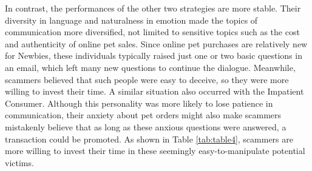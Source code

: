 \documentclass[ oneside,%
                    author={Cassie Qing Tang},
                    degree={BSc},
                     title={An Automated Response System for Disrupting Online Pet Scamming \\ },
                    subtitle={ }]{dissertation}
\begin{document}
In contrast, the performances of the other two strategies are more stable. Their diversity in language and naturalness in emotion made the topics of communication more diversified, not limited to sensitive topics such as the cost and authenticity of online pet sales. Since online pet purchases are relatively new for Newbies, these individuals typically raised just one or two basic questions in an email, which left many new questions to continue the dialogue. Meanwhile, scammers believed that such people were easy to deceive, so they were more willing to invest their time. A similar situation also occurred with the Impatient Consumer. Although this personality was more likely to lose patience in communication, their anxiety about pet orders might also make scammers mistakenly believe that as long as these anxious questions were answered, a transaction could be promoted. As shown in Table \ref{tab:table4}, scammers are more willing to invest their time in these seemingly easy-to-manipulate potential victims.
\\
\end{document}
